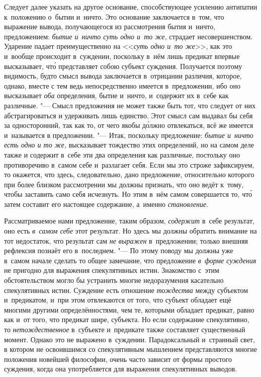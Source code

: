
Следует далее указать на другое основание, способствующее усилению антипатии
к~положению о~бытии и~ничто. Это основание заключается в~том, что выражение
вывода, получающегося из рассмотрения бытия и~ничто, предложением:
{\em бытие и~ничто суть одно и~то же,} страдает несовершенством. Ударение
падает преимущественно на <<{\em суть одно и~то же}>>, как это и~вообще
происходит в~суждении, поскольку в~нём лишь предикат впервые высказывает,
чт\'{о} представляет собою субъект суждения. Получается поэтому видимость,
будто смысл вывода заключается в~отрицании различия, которое, однако, вместе с
тем ведь непосредственно имеется в~предложении, ибо оно высказывает {\em оба}
определения, бытие и~ничто, и~содержит их в~себе как различные. "--- Смысл
предложения не может также быть тот, что следует от них абстрагироваться и
удерживать лишь единство. Этот смысл сам выдавал бы себя за односторонний, так
как то, от чего якобы д\'{о}лжно отвлекаться, всё же имеется и~называется в
предложении. "--- Итак, поскольку предложение: {\em бытие и~ничто есть одно и
то же,} высказывает тождество этих определений, но на самом деле также и
содержит в~себе эти два определения как различные, постольку оно противоречиво
в~самом себе и~разлагает себя. Если мы это строже зафиксируем, то окажется, что
здесь, следовательно, дано предложение, относительно которого при более близком
рассмотрении мы должны признать, что оно ведёт к~тому, чтобы заставить само
себя исчезнуть. Но этим в~нём самом совершается то, чт\'{о} затем составит его
настоящее содержание, а~именно {\em становление}.

Рассматриваемое нами предложение, таким образом, {\em содержит} в~себе
результат, оно есть {\em в~самом себе} этот результат. Но здесь мы должны
обратить внимание на тот недостаток, что результат сам {\em не выражен}
в~предложении; только внешняя рефлексия познаёт его в~последнем. "--- По этому
поводу мы должны уже в~самом начале сделать то общее замечание, что предложение
{\em в~форме суждения} не пригодно для выражения спекулятивных истин.
Знакомство с~этим обстоятельством могло бы устранить многие недоразумения
касательно спекулятивных истин. Суждение есть отношение {\em тождества} между
субъектом и~предикатом, и~при этом отвлекаются от того, что субъект обладает
ещё многими другими определённостями, чем те, которыми обладает предикат, равно
как и~от того, что предикат шире, субъекта. Но если содержание спекулятивно, то
{\em нетождественное} в~субъекте и~предикате также составляет существенный
момент. Однако это не выражено в~суждении. Парадоксальный и~странный свет, в
котором не освоившимся со спекулятивным мышлением представляются многие
положения новейшей философии, очень часто зависит от формы простого суждения,
когда она употребляется для выражения спекулятивных выводов.


